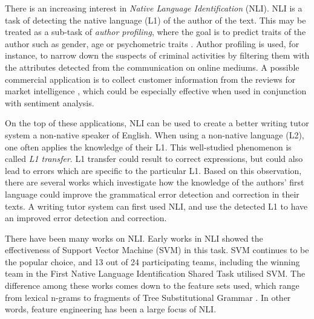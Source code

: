 There is an increasing interest in \emph{Native Language Identification} (NLI).
NLI is a task of detecting the native language (L1) of the author of the text.
This may be treated as a sub-task of \emph{author profiling}, where the goal is to predict traits of the author such as gender, age or psychometric traits  \citep{estival2007author}.
Author profiling is used, for instance, to narrow down the suspects of criminal activities \citep{abbasi2005applying} by filtering them with the attributes detected from the communication on online mediums.
A possible commercial application is to collect customer information from the reviews for market intelligence \citep{glance2005deriving}, which could be especially effective when used in conjunction with sentiment analysis.

On the top of these applications, NLI can be used to create a better writing tutor system a non-native speaker of English.
When using a non-native language (L2), one often applies the knowledge of their L1.
This well-studied phenomenon is called \emph{L1 transfer}\citep{wanner1982language, frenck1997syntactic, dussias2003syntactic, nitschke2010first}.
L1 transfer could result to correct expressions, but could also lead to errors which are specific to the particular L1. 
Based on this observation, there are several works \citep{chang2008automatic, rozovskaya2010generating, rozovskaya2011algorithm, dahlmeier2011correcting} which investigate how the knowledge of the authors' first language could improve the grammatical error detection and correction in their texts.
A writing tutor system can first used NLI, and use the detected L1 to have an improved error detection and correction.

There have been many works on NLI.
Early works in NLI \citep{koppel2005determining, tsur2007using} showed the effectiveness of Support Vector Machine (SVM) in this task.
SVM continues to be the popular choice, and 13 out of 24 participating teams, including the winning team  \citep{jarvis2013maximizing} in the First Native Language Identification Shared Task  \citep{tetreault2013report} utilised SVM.
The difference among these works comes down to the feature sets used, which range from lexical n-grams \citep{koppel2005determining, tsur2007using, jarvis2013maximizing} to fragments of Tree Substitutional Grammar  \citep{swanson2012native}.
In other words, feature engineering has been a large focus of NLI.

